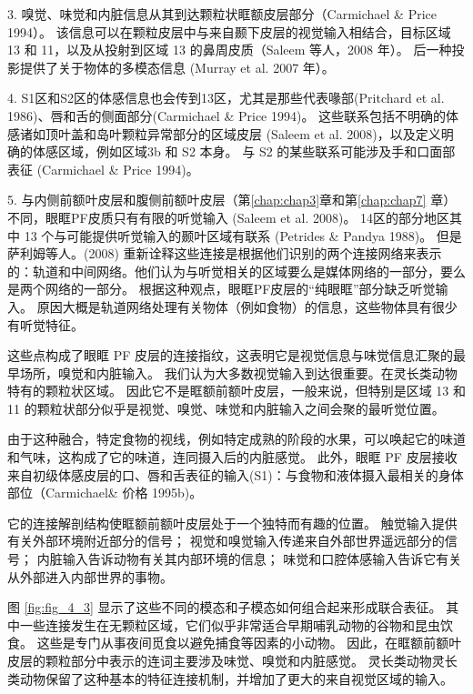 3. 嗅觉、味觉和内脏信息从其到达颗粒状眶额皮层部分（Carmichael \& Price 1994）。
该信息可以在颗粒皮层中与来自颞下皮层的视觉输入相结合，目标区域 13 和 11，以及从投射到区域 13 的鼻周皮质（Saleem 等人，2008 年）。
后一种投影提供了关于物体的多模态信息 (Murray et al.
2007 年）。\par


4. S1区和S2区的体感信息也会传到13区，尤其是那些代表喙部(Pritchard et al. 1986)、唇和舌的侧面部分(Carmichael \& Price 1994)。
这些联系包括不明确的体感诸如顶叶盖和岛叶颗粒异常部分的区域皮层 (Saleem et al. 2008)，以及定义明确的体感区域，例如区域3b 和 S2 本身。
与 S2 的某些联系可能涉及手和口面部表征 (Carmichael \& Price 1994)。\par


5. 与内侧前额叶皮层和腹侧前额叶皮层（第\ref{chap:chap3}章和第\ref{chap:chap7} 章）不同，眼眶PF皮质只有有限的听觉输入 (Saleem et al. 2008)。
14区的部分地区其中 13 个与可能提供听觉输入的颞叶区域有联系 (Petrides \& Pandya 1988)。
但是萨利姆等人。(2008) 重新诠释这些连接是根据他们识别的两个连接网络来表示的：轨道和中间网络。他们认为与听觉相关的区域要么是媒体网络的一部分，要么是两个网络的一部分。
根据这种观点，眼眶PF皮层的“纯眼眶”部分缺乏听觉输入。
原因大概是轨道网络处理有关物体（例如食物）的信息，这些物体具有很少有听觉特征。\par


这些点构成了眼眶 PF 皮层的连接指纹，这表明它是视觉信息与味觉信息汇聚的最早场所，嗅觉和内脏输入。
我们认为大多数视觉输入到达很重要。在灵长类动物特有的颗粒状区域。
因此它不是眶额前额叶皮层，一般来说，但特别是区域 13 和 11 的颗粒状部分似乎是视觉、嗅觉、味觉和内脏输入之间会聚的最听觉位置。\par


由于这种融合，特定食物的视线，例如特定成熟的阶段的水果，可以唤起它的味道和气味，这构成了它的味道，连同摄入后的内脏感觉。
此外，眼眶 PF 皮层接收来自初级体感皮层的口、唇和舌表征的输入(S1)：与食物和液体摄入最相关的身体部位（Carmichael\& 价格 1995b)。\par


它的连接解剖结构使眶额前额叶皮层处于一个独特而有趣的位置。
触觉输入提供有关外部环境附近部分的信号；
视觉和嗅觉输入传递来自外部世界遥远部分的信号；
内脏输入告诉动物有关其内部环境的信息；
味觉和口腔体感输入告诉它有关从外部进入内部世界的事物。\par


图 \ref{fig:fig_4_3} 显示了这些不同的模态和子模态如何组合起来形成联合表征。
其中一些连接发生在无颗粒区域，它们似乎非常适合早期哺乳动物的谷物和昆虫饮食。
这些是专门从事夜间觅食以避免捕食等因素的小动物。
因此，在眶额前额叶皮层的颗粒部分中表示的连词主要涉及味觉、嗅觉和内脏感觉。
灵长类动物灵长类动物保留了这种基本的特征连接机制，并增加了更大的来自视觉区域的输入。\par


